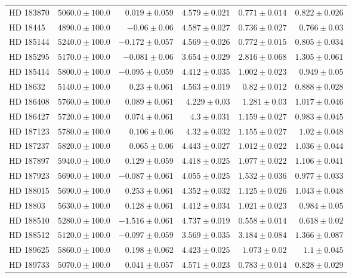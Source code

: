 \begin{longtable*}{lrrrrr}
HD 183870 & $5060.0\pm 100.0$ & $0.019\pm 0.059$ & $4.579\pm 0.021$ & $0.771\pm 0.014$ & $0.822\pm 0.026$ \\ 
HD 18445 & $4890.0\pm 100.0$ & $-0.06\pm 0.06$ & $4.587\pm 0.027$ & $0.736\pm 0.027$ & $0.766\pm 0.03$ \\ 
HD 185144 & $5240.0\pm 100.0$ & $-0.172\pm 0.057$ & $4.569\pm 0.026$ & $0.772\pm 0.015$ & $0.805\pm 0.034$ \\ 
HD 185295 & $5170.0\pm 100.0$ & $-0.081\pm 0.06$ & $3.654\pm 0.029$ & $2.816\pm 0.068$ & $1.305\pm 0.061$ \\ 
HD 185414 & $5800.0\pm 100.0$ & $-0.095\pm 0.059$ & $4.412\pm 0.035$ & $1.002\pm 0.023$ & $0.949\pm 0.05$ \\ 
HD 18632 & $5140.0\pm 100.0$ & $0.23\pm 0.061$ & $4.563\pm 0.019$ & $0.82\pm 0.012$ & $0.888\pm 0.028$ \\ 
HD 186408 & $5760.0\pm 100.0$ & $0.089\pm 0.061$ & $4.229\pm 0.03$ & $1.281\pm 0.03$ & $1.017\pm 0.046$ \\ 
HD 186427 & $5720.0\pm 100.0$ & $0.074\pm 0.061$ & $4.3\pm 0.031$ & $1.159\pm 0.027$ & $0.983\pm 0.045$ \\ 
HD 187123 & $5780.0\pm 100.0$ & $0.106\pm 0.06$ & $4.32\pm 0.032$ & $1.155\pm 0.027$ & $1.02\pm 0.048$ \\ 
HD 187237 & $5820.0\pm 100.0$ & $0.065\pm 0.06$ & $4.443\pm 0.027$ & $1.012\pm 0.022$ & $1.036\pm 0.044$ \\ 
HD 187897 & $5940.0\pm 100.0$ & $0.129\pm 0.059$ & $4.418\pm 0.025$ & $1.077\pm 0.022$ & $1.106\pm 0.041$ \\ 
HD 187923 & $5690.0\pm 100.0$ & $-0.087\pm 0.061$ & $4.055\pm 0.025$ & $1.532\pm 0.036$ & $0.977\pm 0.033$ \\ 
HD 188015 & $5690.0\pm 100.0$ & $0.253\pm 0.061$ & $4.352\pm 0.032$ & $1.125\pm 0.026$ & $1.043\pm 0.048$ \\ 
HD 18803 & $5630.0\pm 100.0$ & $0.128\pm 0.061$ & $4.412\pm 0.034$ & $1.021\pm 0.023$ & $0.984\pm 0.05$ \\ 
HD 188510 & $5280.0\pm 100.0$ & $-1.516\pm 0.061$ & $4.737\pm 0.019$ & $0.558\pm 0.014$ & $0.618\pm 0.02$ \\ 
HD 188512 & $5120.0\pm 100.0$ & $-0.097\pm 0.059$ & $3.569\pm 0.035$ & $3.184\pm 0.084$ & $1.366\pm 0.087$ \\ 
HD 189625 & $5860.0\pm 100.0$ & $0.198\pm 0.062$ & $4.423\pm 0.025$ & $1.073\pm 0.02$ & $1.1\pm 0.045$ \\ 
HD 189733 & $5070.0\pm 100.0$ & $0.041\pm 0.057$ & $4.571\pm 0.023$ & $0.783\pm 0.014$ & $0.828\pm 0.029$ \\ 

\end{longtable*}
